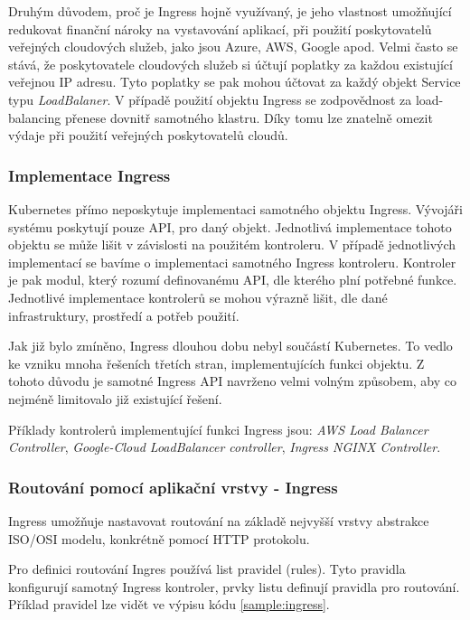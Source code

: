 Druhým důvodem, proč je Ingress hojně využívaný, je jeho vlastnost umožňující redukovat finanční nároky na vystavování aplikací, při použití poskytovatelů veřejných cloudových služeb, jako jsou Azure, AWS, Google apod. Velmi často se stává, že poskytovatele cloudových služeb si účtují poplatky za každou existující veřejnou IP adresu. Tyto poplatky se pak mohou účtovat za každý objekt Service typu \textit{LoadBalaner}. V případě použití objektu Ingress se zodpovědnost za load-balancing přenese dovnitř samotného klastru. Díky tomu lze znatelně omezit výdaje při použití veřejných poskytovatelů cloudů.

\subsubsection{Implementace Ingress}
Kubernetes přímo neposkytuje implementaci samotného objektu Ingress. Vývojáři systému poskytují pouze API, pro daný objekt. Jednotlivá implementace tohoto objektu se může lišit v závislosti na použitém kontroleru. V případě jednotlivých implementací se bavíme o implementaci samotného Ingress kontroleru. Kontroler je pak modul, který rozumí definovanému API, dle kterého plní potřebné funkce. Jednotlivé implementace kontrolerů se mohou výrazně lišit, dle dané infrastruktury, prostředí a potřeb použití.

Jak již bylo zmíněno, Ingress dlouhou dobu nebyl součástí Kubernetes. To vedlo ke vzniku mnoha řešeních třetích stran, implementujících funkci objektu. \cite{kashin_2021_gateway} Z tohoto důvodu je samotné Ingress API navrženo velmi volným způsobem, aby co nejméně limitovalo již existující řešení.

Příklady kontrolerů implementující funkci Ingress jsou: \textit{AWS Load Balancer Controller}, \textit{Google-Cloud LoadBalancer controller}, \textit{Ingress NGINX Controller}. \cite{thekubernetesauthors_2023_ingress}

\subsubsection{Routování pomocí aplikační vrstvy - Ingress}
Ingress umožňuje nastavovat routování na základě nejvyšší vrstvy abstrakce ISO/OSI modelu, konkrétně pomocí HTTP protokolu.

Pro definici routování Ingres používá list pravidel (rules). Tyto pravidla konfigurují samotný Ingress kontroler, prvky listu definují pravidla pro routování. Příklad pravidel lze vidět ve výpisu kódu \ref{sample:ingress}.


